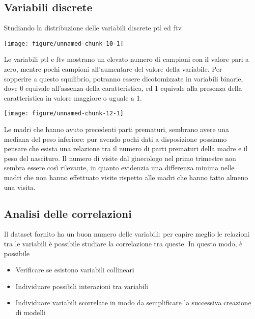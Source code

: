 \documentclass{article}\usepackage[]{graphicx}\usepackage[]{color}
\makeatletter
\def\maxwidth{ %
  \ifdim\Gin@nat@width>\linewidth
    \linewidth
  \else
    \Gin@nat@width
  \fi
}
\newenvironment{knitrout}{}{} %
\makeatother
\begin{document}
\subsection{Variabili discrete}
Studiando la distribuzione delle variabili discrete ptl ed ftv

\begin{knitrout}
\color{fgcolor}
\texttt{[image: figure/unnamed-chunk-10-1]} 
\end{knitrout}

Le variabili ptl e ftv mostrano un elevato numero di campioni con il valore pari a zero, mentre pochi campioni all'aumentare del valore della variabile.
Per sopperire a questo squilibrio, potranno essere dicotomizzate in variabili binarie, dove 0 equivale all'assenza della caratteristica, ed 1 equivale alla presenza della caratteristica in valore maggiore o uguale a 1.



\begin{knitrout}
\color{fgcolor}
\texttt{[image: figure/unnamed-chunk-12-1]} 
\end{knitrout}

Le madri che hanno avuto precedenti parti prematuri, sembrano avere una mediana del peso inferiore: pur avendo pochi dati a disposizione possiamo pensare che esista una relazione tra il numero di parti prematuri della madre e il peso del nascituro.
Il numero di visite dal ginecologo nel primo trimestre non sembra essere così rilevante, in quanto evidenzia una differenza minima nelle madri che non hanno effettuato visite rispetto alle madri che hanno fatto almeno una visita.

\subsection{Analisi delle correlazioni}
Il dataset fornito ha un buon numero delle variabili: per capire meglio le relazioni tra le variabili è possibile studiare la correlazione tra queste.
In questo modo, è possibile
\begin{itemize}
\item Verificare se esistono variabili collineari
\item Individuare possibili interazioni tra variabili
\item Individuare variabili scorrelate in modo da semplificare la successiva creazione di modelli
\end{itemize}
\end{document}
